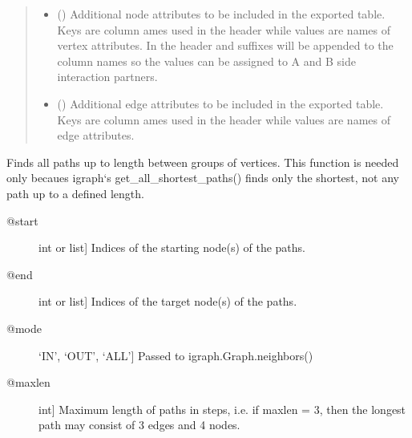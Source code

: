 \documentclass[letterpaper,10pt,english]{sphinxmanual}
\begin{document}
\begin{fulllineitems}
\begin{fulllineitems}
\begin{quote}
\begin{description}
\begin{itemize}
\item {} 
 () \textendash{} Additional node attributes to be included in the exported table.
Keys are column ames used in the header while values are names
of vertex attributes. In the header  and  suffixes will
be appended to the column names so the values can be assigned to
A and B side interaction partners.

\item {} 
 () \textendash{} Additional edge attributes to be included in the exported table.
Keys are column ames used in the header while values are names
of edge attributes.

\end{itemize}

\end{description}\end{quote}

\end{fulllineitems}


\begin{fulllineitems}
\label{\detokenize{main:pypath.main.PyPath.find_all_paths}}
Finds all paths up to length  between groups of
vertices. This function is needed only becaues igraph{}`s
get\_all\_shortest\_paths() finds only the shortest, not any
path up to a defined length.
\begin{description}
\item[{@start}] \leavevmode{[}int or list{]}
Indices of the starting node(s) of the paths.

\item[{@end}] \leavevmode{[}int or list{]}
Indices of the target node(s) of the paths.

\item[{@mode}] \leavevmode{[}‘IN’, ‘OUT’, ‘ALL’{]}
Passed to igraph.Graph.neighbors()

\item[{@maxlen}] \leavevmode{[}int{]}
Maximum length of paths in steps, i.e. if maxlen = 3, then
the longest path may consist of 3 edges and 4 nodes.


\end{description}
\end{fulllineitems}
\end{fulllineitems}
\end{document}
